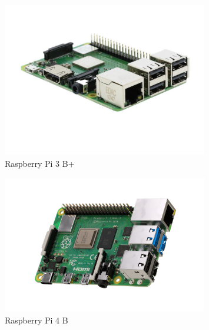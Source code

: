 \documentclass[11pt]{article}
\begin{document}
 \begin{figure}[h!]
\centering
\includegraphics[width=0.8\textwidth]{rpi-3-b-plus.jpg}
\captionsetup{justification=centering}
\caption{Raspberry Pi 3 B+}
\end{figure}
\begin{figure}[h!]
\centering
\includegraphics[width=0.8\textwidth]{rpi-4.png}
\captionsetup{justification=centering}
\caption{Raspberry Pi 4 B}
\end{figure}
\end{document}
